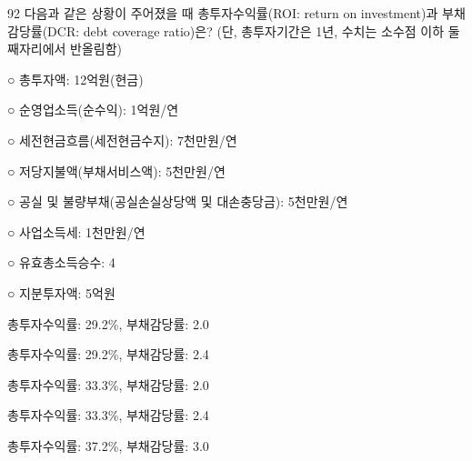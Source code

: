 \begin{question}{92}
다음과 같은 상황이 주어졌을 때 총투자수익률(ROI: return on investment)과 부채감당률(DCR: debt coverage ratio)은? (단, 총투자기간은 1년, 수치는 소수점 이하 둘째자리에서 반올림함)
\begin{framedtext}
○ 총투자액: 12억원(현금) \par
○ 순영업소득(순수익): 1억원/연 \par
○ 세전현금흐름(세전현금수지): 7천만원/연 \par
○ 저당지불액(부채서비스액): 5천만원/연 \par
○ 공실 및 불량부채(공실손실상당액 및 대손충당금): 5천만원/연 \par
○ 사업소득세: 1천만원/연 \par
○ 유효총소득승수: 4 \par
○ 지분투자액: 5억원 \par
\end{framedtext}
\begin{choices}
  \item 총투자수익률: 29.2\%, 부채감당률: 2.0
  \item 총투자수익률: 29.2\%, 부채감당률: 2.4
  \item 총투자수익률: 33.3\%, 부채감당률: 2.0
  \item 총투자수익률: 33.3\%, 부채감당률: 2.4
  \item 총투자수익률: 37.2\%, 부채감당률: 3.0
\end{choices}
\end{question}
\answerall
{}
